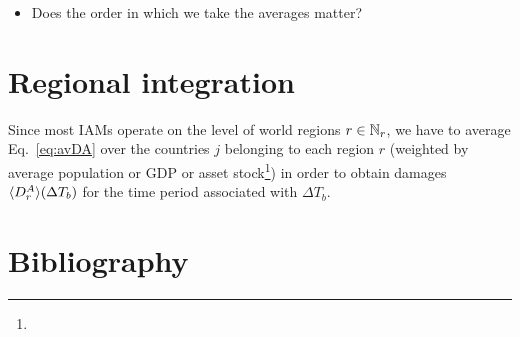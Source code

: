 \documentclass[preprint,3p,authoryear]{elsarticle}
\begin{document}
\begin{itemize}
\item Does the order in which we take the averages matter?
\end{itemize}

\section{Regional integration}
\label{sec:regInt}
Since most IAMs operate on the level of world regions $r\in\mathbb{N}_r$, we have to average Eq.~\eqref{eq:avDA} over the countries $j$ belonging to each region $r$ (weighted by average population or GDP or asset stock\footnote{})  in order to obtain damages $\langle D^A_{r}\rangle(\Delta T_b)$ for the time period associated with $\Delta T_b$.



\section*{Bibliography}
%

\end{document}
